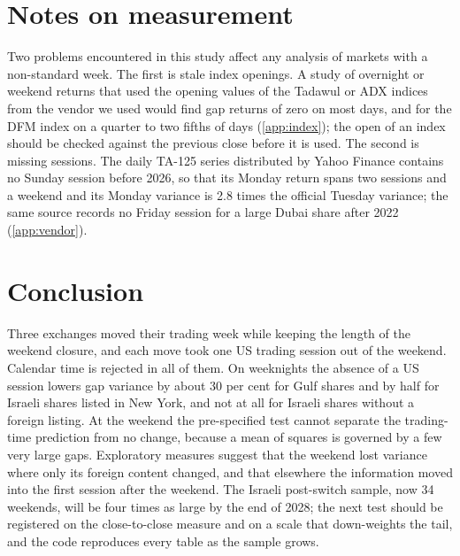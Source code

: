 \section{Notes on measurement}\label{sec:measure}

Two problems encountered in this study affect any analysis of markets with a non-standard week. The first is stale index openings. A study of overnight or weekend returns that used the opening values of the Tadawul or ADX indices from the vendor we used would find gap returns of zero on most days, and for the DFM index on a quarter to two fifths of days (\ref{app:index}); the open of an index should be checked against the previous close before it is used. The second is missing sessions. The daily TA-125 series distributed by Yahoo Finance contains no Sunday session before 2026, so that its Monday return spans two sessions and a weekend and its Monday variance is 2.8 times the official Tuesday variance; the same source records no Friday session for a large Dubai share after 2022 (\ref{app:vendor}).

\section{Conclusion}\label{sec:conc}

Three exchanges moved their trading week while keeping the length of the weekend closure, and each move took one US trading session out of the weekend. Calendar time is rejected in all of them. On weeknights the absence of a US session lowers gap variance by about 30 per cent for Gulf shares and by half for Israeli shares listed in New York, and not at all for Israeli shares without a foreign listing. At the weekend the pre-specified test cannot separate the trading-time prediction from no change, because a mean of squares is governed by a few very large gaps. Exploratory measures suggest that the weekend lost variance where only its foreign content changed, and that elsewhere the information moved into the first session after the weekend. The Israeli post-switch sample, now 34 weekends, will be four times as large by the end of 2028; the next test should be registered on the close-to-close measure and on a scale that down-weights the tail, and the code reproduces every table as the sample grows.
